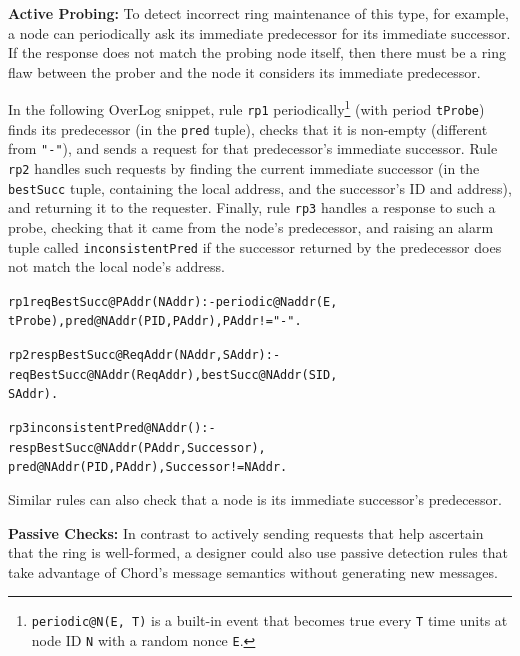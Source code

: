\documentclass{sig-alt-full}
\renewcommand{\paragraph}[1]{{\bf #1:}}
\newenvironment{overlog}{\begin{alltt}\footnotesize}{\end{alltt}}
\newcommand{\ol}[1]{{\tt\footnotesize#1}}
\begin{document}
\paragraph{Active Probing}  To detect incorrect ring
maintenance of this type, for example, a node can
periodically ask its immediate predecessor for its
immediate successor.  If the response does not match
the probing node itself, then there must be a ring
flaw between the prober and the node it
considers its immediate predecessor.

In the following OverLog snippet, rule \ol{rp1}
periodically\footnote{\ol{periodic@N(E, T)} is a built-in event that becomes true every
\ol{T} time units at node ID \ol{N} with a random nonce \ol{E}.}
 (with period \ol{tProbe}) finds its
predecessor (in the \ol{pred} tuple), checks that it
is non-empty (different from \ol{"-"}), and sends a
request for that predecessor's immediate successor.
Rule \ol{rp2} handles such requests by finding the
current immediate successor (in the \ol{bestSucc}
tuple, containing the local address, and the
successor's ID and address), and returning it to the requester.  Finally,
rule \ol{rp3} handles a response to such a probe,
checking that it came from the node's predecessor,
and raising an alarm tuple called
\ol{inconsistentPred} if the successor returned by
the predecessor does not match the local node's
address.
\begin{overlog}
rp1 reqBestSucc@PAddr(NAddr) :- periodic@Naddr(E,
   tProbe), pred@NAddr(PID, PAddr), PAddr != "-".

rp2 respBestSucc@ReqAddr(NAddr, SAddr) :-
   reqBestSucc@NAddr(ReqAddr), bestSucc@NAddr(SID,
   SAddr).

rp3 inconsistentPred@NAddr():-
   respBestSucc@NAddr(PAddr, Successor),
   pred@NAddr(PID, PAddr), Successor != NAddr.
\end{overlog}
Similar rules can also check that a node is its
immediate successor's predecessor.


\paragraph{Passive Checks} In contrast to actively
sending requests that help ascertain that the ring
is well-formed, a designer could also use passive
detection rules that take advantage of Chord's
message semantics without generating new messages.
\end{document}
